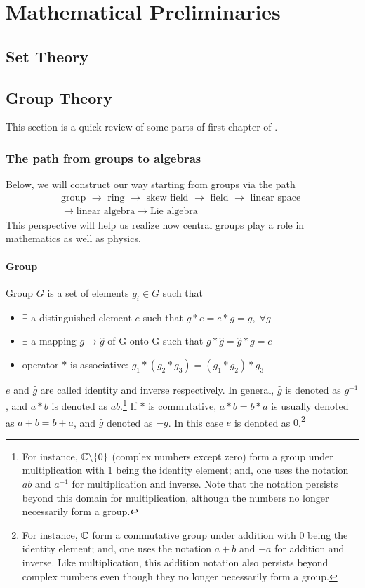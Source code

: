 \chapter{Mathematical Preliminaries}
\section{Set Theory}
\section{Group Theory}
This section is a quick review of some parts of first chapter of \cite{vilenkin2012representation}.
\subsection{The path from groups to algebras}
Below, we will construct our way starting from groups via the path
\begin{multline}
\text{group }\to\text{ ring }\to\text{ skew field }\to\text{ field }\to\text{ linear space }\\\to\text{linear algebra}\to\text{Lie algebra}
\end{multline}
This perspective will help us realize how central groups play a role in mathematics as well as physics.
\subsubsection{Group}
Group $G$ is a set of elements $g_i \in G$ such that
\begin{itemize}
	\item $\exists$ a distinguished element $e$ such that $g*e=e*g=g,\; \forall g$
	\item $\exists$ a mapping $g\to \hat g$ of G onto G such that $g*\hat g=\hat g*g=e$
	\item operator $*$ is associative: $g_1*(g_2*g_3)=(g_1*g_2)*g_3$
\end{itemize}
$e$ and $\hat g$ are called identity and inverse respectively. In general, $\hat g$ is denoted as $g^{-1}$, and $a*b$ is denoted as $a b$.\footnote{For instance, $\mathbb{C}\backslash\{0\}$ (complex numbers except zero) form a group under multiplication with $1$ being the identity element; and, one uses the notation $ab$ and $a^{-1}$ for multiplication and inverse. Note that the notation persists beyond this domain for multiplication, although the numbers no longer necessarily form a group.} If $*$ is commutative, $a*b=b*a$ is usually denoted as $a+b=b+a$, and $\hat g$ denoted as $-g$. In this case $e$ is denoted as $0$.\footnote{For instance, $\mathbb{C}$ form a commutative group under addition with $0$ being the identity element; and, one uses the notation $a+b$ and $-a$ for addition and inverse. Like multiplication, this addition notation also persists beyond complex numbers even though they no longer necessarily form a group.}


